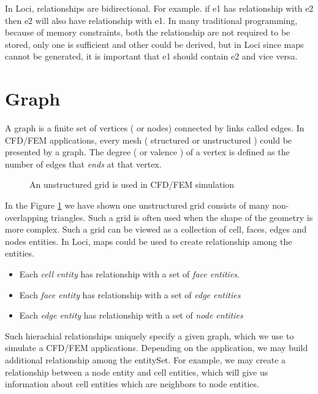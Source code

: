 \par In Loci, relationships are bidirectional.  For example. if e1 has relationship
with e2 then e2 will also have relationship with e1. In many traditional programming, 
because of memory constraints, both the relationship are not required to be stored, 
only one is sufficient and other could be derived, but in Loci since maps cannot
be generated, it is important that e1 should contain e2 and vice versa.

\section { Graph }
A graph is a finite set of vertices ( or nodes) connected by links called edges. 
In CFD/FEM applications, every mesh ( structured or unstructured ) could be 
presented by a graph. The degree ( or valence ) of a vertex is defined as the
number of edges that {\em ends} at that vertex.  

\begin{figure}[h]
\vspace{2.0in}\caption { An unstructured grid is used in CFD/FEM simulation }
\label{FigGraph}
\end{figure}

\par In the Figure \ref{FigGraph} we have shown one unstructured grid consists of
many non-overlapping triangles. Such a grid is often used when the shape of the geometry 
is more complex. Such a grid can be viewed as a collection of cell, faces, edges
and nodes entities. In Loci, maps could be used to create relationship among the
entities.  
\begin{itemize}
\item Each {\em cell entity} has relationship with a set of {\em face entities}.
\item Each {\em face entity} has relationship with a set of {\em edge entities}
\item Each {\em edge entity} has relationship with a set of {\em node entities}
\end{itemize}
Such hierachial relationships uniquely specify a given graph,
which we use to simulate a CFD/FEM applications. Depending on the application, 
we may build additional relationship among the entitySet. For example, we may 
create a relationship between a node entity and cell entities, which will give 
us information about cell entities which are neighbors to node entities.

